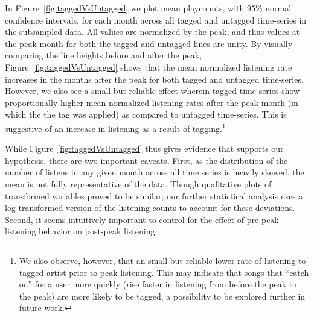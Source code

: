 In Figure~\ref{fig:taggedVsUntagged} we plot mean playcounts, with 95\% normal confidence intervals, for each month across all tagged and untagged time-series in the subsampled data. All values are normalized by the peak, and thus values at the peak month for both the tagged and untagged lines are unity. By visually comparing the line heights before and after the peak, Figure~\ref{fig:taggedVsUntagged} shows that the mean normalized listening rate increases in the months after the peak for both tagged and untagged time-series. However, we also see a small but reliable effect wherein tagged time-series show proportionally higher mean normalized listening rates after the peak month (in which the the tag was applied) as compared to untagged time-series. This is suggestive of an increase in listening as a result of tagging.\footnote{We also observe, however, that an small but reliable lower rate of listening to tagged artist prior to peak listening. This may indicate that songs that ``catch on'' for a user more quickly (rise faster in listening from before the peak to the peak) are more likely to be tagged, a possibility to be explored further in future work.}

While Figure~\ref{fig:taggedVsUntagged} thus gives evidence that supports our hypothesis, there are two important caveats. First, as the distribution of the number of listens in any given month across all time series is heavily skewed, the mean is not fully representative of the data. Though qualitative plots of transformed variables proved to be similar, our further statistical analysis uses a log transformed version of the listening counts to account for these deviations. Second, it seems intuitively important to control for the effect of pre-peak listening behavior on post-peak listening.

